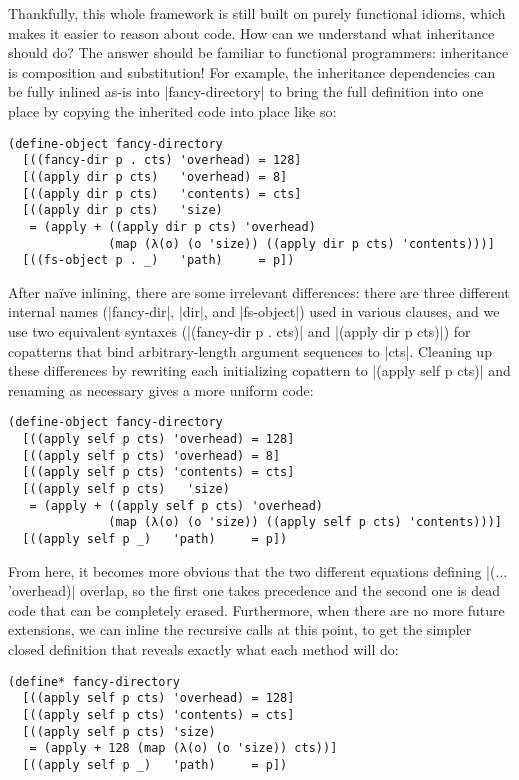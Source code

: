 Thankfully, this whole framework is still built on purely functional idioms, which makes it easier to reason about code.
How can we understand what inheritance should do?
The answer should be familiar to functional programmers: inheritance is composition and substitution!
For example, the inheritance dependencies can be fully inlined as-is into \scm|fancy-directory| to bring the full definition into one place by copying the inherited code into place like so:
\begin{verbatim}
(define-object fancy-directory
  [((fancy-dir p . cts) 'overhead) = 128]
  [((apply dir p cts)   'overhead) = 8]
  [((apply dir p cts)   'contents) = cts]
  [((apply dir p cts)   'size)
   = (apply + ((apply dir p cts) 'overhead)
              (map (λ(o) (o 'size)) ((apply dir p cts) 'contents)))]
  [((fs-object p . _)   'path)     = p])
\end{verbatim}
After na\"ive inlining, there are some irrelevant differences: there are three different internal names (\scm|fancy-dir|, \scm|dir|, and \scm|fs-object|) used in various clauses, and we use two equivalent syntaxes  (\scm|(fancy-dir p . cts)| and \scm|(apply dir p cts)|) for copatterns that bind arbitrary-length argument sequences to \scm|cts|.
Cleaning up these differences by rewriting each initializing copattern to \scm|(apply self p cts)| and renaming as necessary gives a more uniform code:
\begin{verbatim}
(define-object fancy-directory
  [((apply self p cts) 'overhead) = 128]
  [((apply self p cts) 'overhead) = 8]
  [((apply self p cts) 'contents) = cts]
  [((apply self p cts)   'size)
   = (apply + ((apply self p cts) 'overhead)
              (map (λ(o) (o 'size)) ((apply self p cts) 'contents)))]
  [((apply self p _)   'path)     = p])
\end{verbatim}
From here, it becomes more obvious that the two different equations defining \scm|(... 'overhead)| overlap, so the first one takes precedence and the second one is dead code that can be completely erased.
Furthermore, when there are no more future extensions, we can inline the recursive calls at this point, to get the simpler closed definition that reveals exactly what each method will do:
\begin{verbatim}
(define* fancy-directory
  [((apply self p cts) 'overhead) = 128]
  [((apply self p cts) 'contents) = cts]
  [((apply self p cts) 'size)
   = (apply + 128 (map (λ(o) (o 'size)) cts))]
  [((apply self p _)   'path)     = p])
\end{verbatim}

